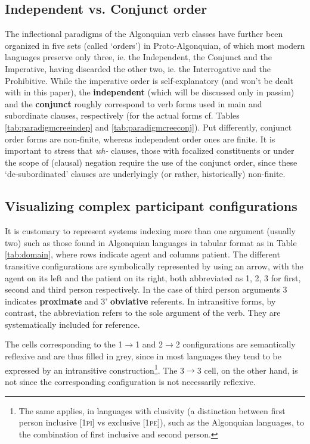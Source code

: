 \documentclass[twoside,a4paper,11pt]{article}
\newcommand{\Σ}{\greek{Σ}}
\newcommand{\pli}{\textsc{pi}}
\newcommand{\pe}{\textsc{pe}}
\begin{document}
\subsection{Independent vs. Conjunct order}
The inflectional paradigms of the Algonquian verb classes have further been organized in five sets (called `orders') in Proto-Algonquian, of which most modern languages preserve only three, ie. the Independent, the Conjunct and the Imperative, having discarded the other two, ie. the Interrogative and the Prohibitive. While the imperative order is self-explanatory (and won't be dealt with in this paper), the \textbf{independent} (which will be discussed only in passim) and the \textbf{conjunct} roughly correspond to verb forms used in main and subordinate clauses, respectively (for the actual forms cf. Tables \ref{tab:paradigmcreeindep} and \ref{tab:paradigmcreeconj}). Put differently, conjunct order forms are non-finite, whereas independent order ones are finite. It is important to stress that \textit{wh-} clauses, those with focalized constituents or under the scope of (clausal) negation require the use of the conjunct order, since these `de-subordinated' clauses are underlyingly (or rather, historically) non-finite.

\subsection{Visualizing complex participant configurations}
\label{subsec:visual}
It is customary to represent systems indexing more than one argument (usually two) such as those found in Algonquian languages in tabular format as in Table \ref{tab:domain}, where rows indicate agent and columns patient. The different transitive configurations are symbolically represented by using an arrow, with the agent on its left and the patient on its right, both abbreviated as 1, 2, 3 for first, second and third person respectively. In the case of third person arguments 3 indicates \textbf{proximate} and 3' \textbf{obviative} referents. In intransitive forms, by contrast, the abbreviation refers to the sole argument of the verb. They are systematically included for reference.

The cells corresponding to the 1$\rightarrow$1 and 2$\rightarrow$2 configurations are semantically reflexive and are thus filled in grey, since in most languages they tend to be expressed by an intransitive construction\footnote{The same applies, in languages with clusivity (a distinction between first person inclusive [1\pli] vs exclusive [1\pe]), such as the Algonquian languages, to the combination of first inclusive and second person.}. The 3$\rightarrow$3 cell, on the other hand, is not since the corresponding configuration is not necessarily reflexive.
\end{document}

